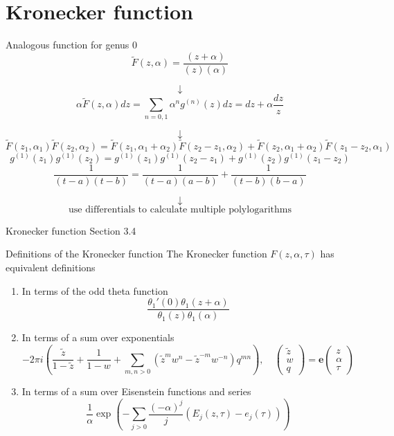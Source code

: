 \documentclass[11pt,aspectratio=169]{beamer}
\newcommand{\ee}[0]{\mathbf{e}}
\begin{document}
\section{Kronecker function}

\begin{frame}{Analogous function for genus 0}
    \[\tilde F(z,\alpha) = \frac{(z+\alpha)}{(z)(\alpha)}\]

    \pause{}

    \[\downarrow\]
    \[\alpha \tilde F(z,\alpha) dz = \sum_{n=0,1} \alpha^n g^{(n)}(z) dz = dz + \alpha \frac{dz}{z}\]
    
    \pause{}
    
    \[\downarrow\]
    \[\tilde{F}(z_1,\alpha_1)\tilde{F}(z_2,\alpha_2) = \tilde{F}(z_1,\alpha_1+\alpha_2)\tilde{F}(z_2-z_1,\alpha_2) + \tilde{F}(z_2,\alpha_1+\alpha_2)\tilde{F}(z_1-z_2,\alpha_1)\]
    \[g^{(1)}(z_1)g^{(1)}(z_2) = g^{(1)}(z_1)g^{(1)}(z_2-z_1) + g^{(1)}(z_2)g^{(1)}(z_1-z_2)\]
    \[\frac{1}{(t-a)(t-b)} = \frac{1}{(t-a)(a-b)} + \frac{1}{(t-b)(b-a)}\]
    
    \pause{}
    
    \[\downarrow\]
    \[\text{use differentials to calculate multiple polylogarithms}\]
\end{frame}

\begin{frame}{Kronecker function}{\tiny \cite{BL13} Section 3.4}
    \begin{block}{Definitions of the Kronecker function}
        The Kronecker function $F(z,\alpha,\tau)$ has equivalent definitions
        \begin{enumerate}
            \item In terms of the odd theta function
            \[\frac{\theta_1'(0)\theta_1(z+\alpha)}{\theta_1(z)\theta_1(\alpha)}\]
            \item In terms of a sum over exponentials
            \[-2\pi i \left(\frac{\tilde z}{1-\tilde z} + \frac{1}{1-w} + \sum_{m,n > 0} (\tilde z^m w^n - \tilde z^{-m} w^{-n}) q^{mn}\right) , \quad \begin{pmatrix} \tilde z \\ w \\ q \end{pmatrix} = \ee \begin{pmatrix}z \\ \alpha \\ \tau\end{pmatrix}\]
            \item In terms of a sum over Eisenstein functions and series
            \[\frac{1}{\alpha} \exp\left(-\sum_{j > 0} \frac{(-\alpha)^j}{j} (E_j(z,\tau) - e_j(\tau))\right)\]
        \end{enumerate}
    \end{block}
\end{frame}
\end{document}
